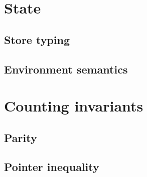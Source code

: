 \section{State}

\subsection{Store typing}


\subsection{Environment semantics}

\section{Counting invariants}

\subsection{Parity}

\subsection{}

\subsection{Pointer inequality}
\label{sec:pointer-inequality}

